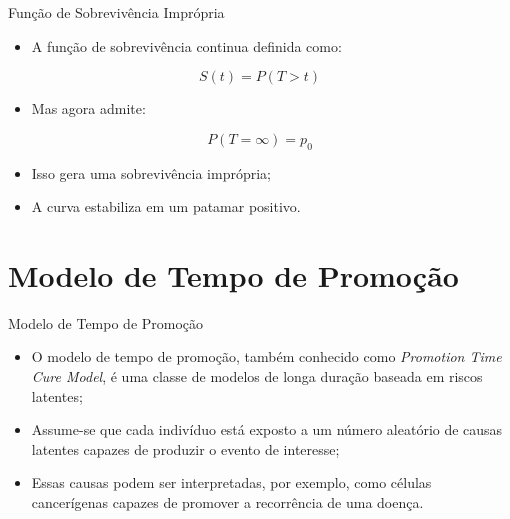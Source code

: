 \documentclass[aspectratio=169,t,xcolor=table]{beamer}
\begin{document}
\begin{frame}{Função de Sobrevivência Imprópria}

\begin{itemize}
\item A função de sobrevivência continua definida como:
\end{itemize}

$$
S(t)=P(T>t)
$$

\vspace{0.4cm}

\begin{itemize}
\item Mas agora admite:
\end{itemize}

$$
P(T=\infty)=p_0
$$

\vspace{0.4cm}

\begin{itemize}
\item Isso gera uma sobrevivência imprópria;

\vspace{0.2cm}

\item A curva estabiliza em um patamar positivo.

\end{itemize}

\end{frame}

\section{Modelo de Tempo de Promoção}

\begin{frame}{Modelo de Tempo de Promoção}

\begin{itemize}
\item O modelo de tempo de promoção, também conhecido como \textit{Promotion Time Cure Model}, é uma classe de modelos de longa duração baseada em riscos latentes;

\vspace{0.3cm}

\item Assume-se que cada indivíduo está exposto a um número aleatório de causas latentes capazes de produzir o evento de interesse;

\vspace{0.3cm}

\item Essas causas podem ser interpretadas, por exemplo, como células cancerígenas capazes de promover a recorrência de uma doença.

\end{itemize}

\end{frame}
\end{document}
